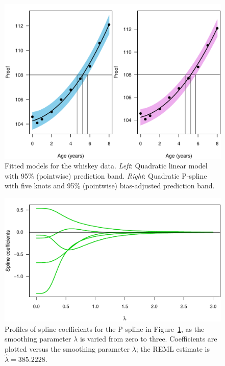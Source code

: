 \documentclass[cmfont,usenames,dvipsnames,leqno]{afit-etd}\usepackage[]{graphicx}\usepackage[]{color}
\makeatletter
\def\maxwidth{ %
  \ifdim\Gin@nat@width>\linewidth
    \linewidth
  \else
    \Gin@nat@width
  \fi
}
\newenvironment{knitrout}{}{} %
\renewenvironment{knitrout}{\begin{singlespace}}{\end{singlespace}}
\newcommand{\wh}[1]{\ensuremath{\widehat{#1}}}
\makeatother
\begin{document}
\begin{knitrout}
\color{fgcolor}\begin{figure}[H]

\includegraphics[width=\maxwidth]{figure/whiskey-calibration} \caption[Fitted  models for the whiskey data]{Fitted  models for the whiskey data. \textit{Left}: Quadratic linear model with 95\% (pointwise) prediction band. \textit{Right}: Quadratic \ac{P-spline} with five knots and 95\% (pointwise) bias-adjusted prediction band.\label{fig:whiskey-calibration}}
\end{figure}


\end{knitrout}


\begin{knitrout}
\color{fgcolor}\begin{figure}[H]

\includegraphics[width=\maxwidth]{figure/whiskey-paths} \caption[Spline coefficient paths for the whiskey example]{Profiles of spline coefficients for the \ac{P-spline} in Figure~\ref{fig:whiskey-calibration}, as the smoothing parameter $\lambda$ is varied from zero to three. Coefficients are plotted versus the smoothing parameter $\lambda$; the \ac{REML} estimate is $\wh{\lambda} = 385.2228$.\label{fig:whiskey-paths}}
\end{figure}


\end{knitrout}
\end{document}
